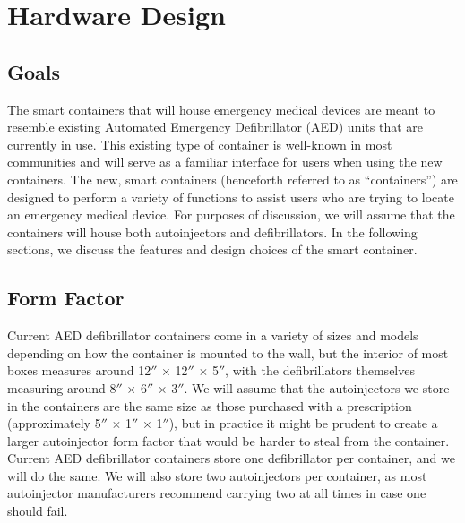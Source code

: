 \section{Hardware Design} \label{sec:hard-design}

\onehalfspacing

\subsection{Goals}

The smart containers that will house emergency medical devices are meant to resemble existing Automated Emergency Defibrillator (AED) units that are currently in use. This existing type of container is well-known in most communities and will serve as a familiar interface for users when using the new containers. The new, smart containers (henceforth referred to as ``containers'') are designed to perform a variety of functions to assist users who are trying to locate an emergency medical device. For purposes of discussion, we will assume that the containers will house both autoinjectors and defibrillators. In the following sections, we discuss the features and design choices of the smart container.

\subsection{Form Factor}

Current AED defibrillator containers come in a variety of sizes and models depending on how the container is mounted to the wall, but the interior of most boxes measures around 12$''$ $\times$ 12$''$ $\times$ 5$''$, with the defibrillators themselves measuring around 8$''$ $\times$ 6$''$ $\times$ 3$''$. We will assume that the autoinjectors we store in the containers are the same size as those purchased with a prescription (approximately 5$''$ $\times$ 1$''$ $\times$ 1$''$), but in practice it might be prudent to create a larger autoinjector form factor that would be harder to steal from the container. Current AED defibrillator containers store one defibrillator per container, and we will do the same. We will also store two autoinjectors per container, as most autoinjector manufacturers recommend carrying two at all times in case one should fail.

